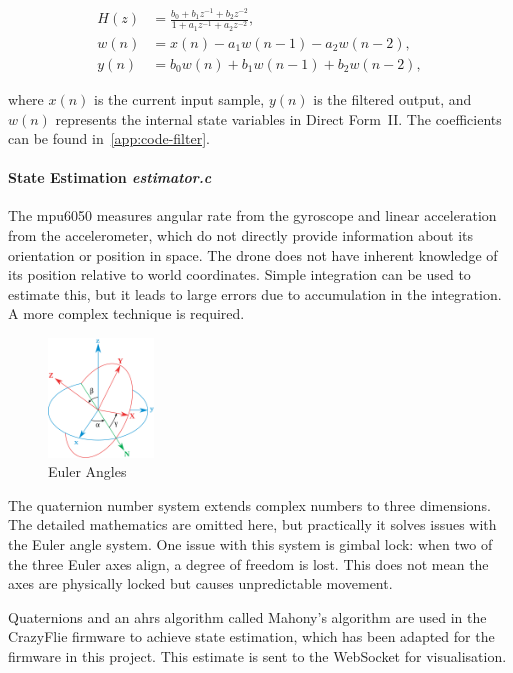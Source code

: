 \begin{align}
H(z) &= \frac{b_0 + b_1 z^{-1} + b_2 z^{-2}}{1 + a_1 z^{-1} + a_2 z^{-2}}, \\[6pt]
w(n) &= x(n) - a_1 w(n-1) - a_2 w(n-2), \\[6pt]
y(n) &= b_0 w(n) + b_1 w(n-1) + b_2 w(n-2),
\end{align}

where \( x(n) \) is the current input sample, \( y(n) \) is the filtered output, and \( w(n) \) represents the internal state variables in Direct Form~II. The coefficients can be found in~\ref{app:code-filter}.

\paragraph{\textbf{State Estimation} \textit{estimator.c}} \leavevmode 

The \gls{mpu6050} measures angular rate from the gyroscope and linear acceleration from the accelerometer, which do not directly provide information about its orientation or position in space. The drone does not have inherent knowledge of its position relative to world coordinates. Simple integration can be used to estimate this, but it leads to large errors due to accumulation in the integration. A more complex technique is required.

\begin{figure}[H]
    \centering
    \includegraphics[width=0.25\textwidth]{img/euler.PNG}
    \caption{Euler Angles~\cite{euler_angles_wikipedia}}
\end{figure}

The quaternion number system extends complex numbers to three dimensions. The detailed mathematics are omitted here, but practically it solves issues with the Euler angle system. One issue with this system is gimbal lock: when two of the three Euler axes align, a degree of freedom is lost. This does not mean the axes are physically locked but causes unpredictable movement.

Quaternions and an \gls{ahrs} algorithm called Mahony's algorithm are used in the CrazyFlie firmware to achieve state estimation, which has been adapted for the firmware in this project. This estimate is sent to the WebSocket for visualisation.


